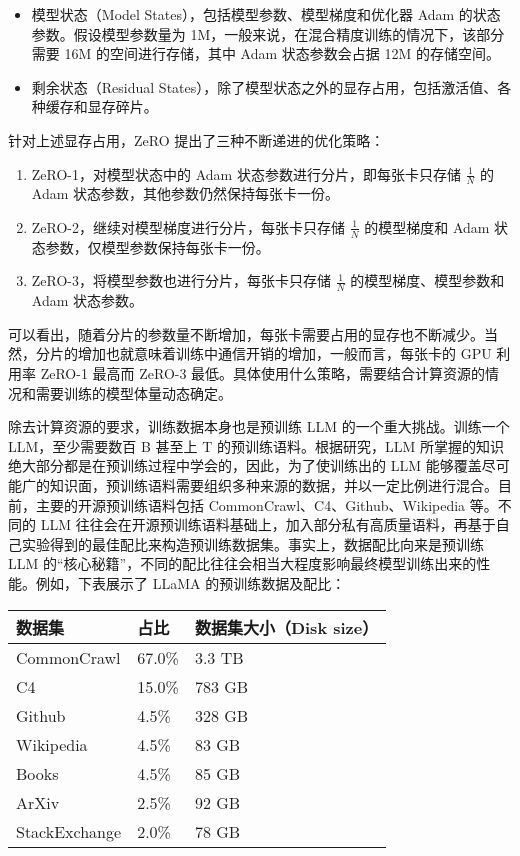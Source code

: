 \documentclass[
]{article}
\providecommand{\tightlist}{%
  \setlength{\itemsep}{0pt}\setlength{\parskip}{0pt}}
\begin{document}
\begin{itemize}
\tightlist
\item
  模型状态（Model States），包括模型参数、模型梯度和优化器 Adam
  的状态参数。假设模型参数量为
  1M，一般来说，在混合精度训练的情况下，该部分需要 16M
  的空间进行存储，其中 Adam 状态参数会占据 12M 的存储空间。
\item
  剩余状态（Residual
  States），除了模型状态之外的显存占用，包括激活值、各种缓存和显存碎片。
\end{itemize}

针对上述显存占用，ZeRO 提出了三种不断递进的优化策略：

\begin{enumerate}
\def\labelenumi{\arabic{enumi}.}
\tightlist
\item
  ZeRO-1，对模型状态中的 Adam 状态参数进行分片，即每张卡只存储
  \(\frac{1}{N}\) 的 Adam 状态参数，其他参数仍然保持每张卡一份。
\item
  ZeRO-2，继续对模型梯度进行分片，每张卡只存储 \(\frac{1}{N}\)
  的模型梯度和 Adam 状态参数，仅模型参数保持每张卡一份。
\item
  ZeRO-3，将模型参数也进行分片，每张卡只存储 \(\frac{1}{N}\)
  的模型梯度、模型参数和 Adam 状态参数。
\end{enumerate}

可以看出，随着分片的参数量不断增加，每张卡需要占用的显存也不断减少。当然，分片的增加也就意味着训练中通信开销的增加，一般而言，每张卡的
GPU 利用率 ZeRO-1 最高而 ZeRO-3
最低。具体使用什么策略，需要结合计算资源的情况和需要训练的模型体量动态确定。

除去计算资源的要求，训练数据本身也是预训练 LLM 的一个重大挑战。训练一个
LLM，至少需要数百 B 甚至上 T 的预训练语料。根据研究，LLM
所掌握的知识绝大部分都是在预训练过程中学会的，因此，为了使训练出的 LLM
能够覆盖尽可能广的知识面，预训练语料需要组织多种来源的数据，并以一定比例进行混合。目前，主要的开源预训练语料包括
CommonCrawl、C4、Github、Wikipedia 等。不同的 LLM
往往会在开源预训练语料基础上，加入部分私有高质量语料，再基于自己实验得到的最佳配比来构造预训练数据集。事实上，数据配比向来是预训练
LLM
的``核心秘籍''，不同的配比往往会相当大程度影响最终模型训练出来的性能。例如，下表展示了
LLaMA 的预训练数据及配比：

\begin{longtable}[]{@{}lll@{}}
\toprule\noalign{}
数据集 & 占比 & 数据集大小（Disk size） \\
\midrule\noalign{}
\endhead
\bottomrule\noalign{}
\endlastfoot
CommonCrawl & 67.0\% & 3.3 TB \\
C4 & 15.0\% & 783 GB \\
Github & 4.5\% & 328 GB \\
Wikipedia & 4.5\% & 83 GB \\
Books & 4.5\% & 85 GB \\
ArXiv & 2.5\% & 92 GB \\
StackExchange & 2.0\% & 78 GB \\
\end{longtable}
\end{document}
